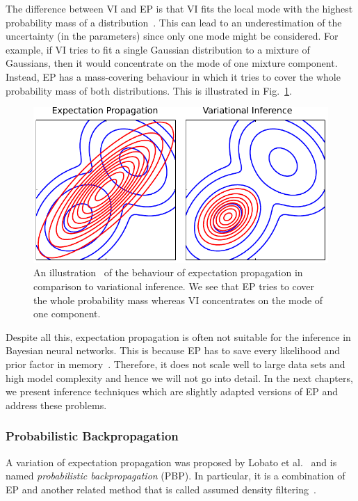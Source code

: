 \documentclass[runningheads]{llncs}
\begin{document}
The difference between VI and EP is that VI fits the local mode with the highest probability mass of a distribution~\cite{hernandez2016black}.
This can lead to an underestimation of the uncertainty (in the parameters) since only one mode might be considered.
For example, if VI tries to fit a single Gaussian distribution to a mixture of Gaussians, then it would concentrate on the mode of one mixture component. 
Instead, EP has a mass-covering behaviour in which it tries to cover the whole probability mass of both distributions. This is illustrated in Fig.~\ref{fig:EPvsVI}.
\begin{figure}
    \centering
    \includegraphics[width=.8\textwidth]{images/EPvsVI.pdf}
    \caption{An illustration~\cite{bishop:2006:PRML} of the behaviour of expectation propagation in comparison to variational inference. We see that EP tries to cover the whole probability mass whereas VI concentrates on the mode of one component.}
    \label{fig:EPvsVI}
\end{figure}

Despite all this, expectation propagation is often not suitable for the inference in Bayesian neural networks. 
This is because EP has to save every likelihood and prior factor in memory~\cite{minka2001expectation}.
Therefore, it does not scale well to large data sets and high model complexity and hence we will not go into detail.
In the next chapters, we present inference techniques which are slightly adapted versions of EP and address these problems.

\subsubsection{Probabilistic Backpropagation}
A variation of expectation propagation was proposed by Lobato et al.~\cite{hernandez2015probabilistic} and is named \textit{probabilistic backpropagation} (PBP).
In particular, it is a combination of EP and another related method that is called assumed density filtering~\cite{minka2001expectation}.
\end{document}
